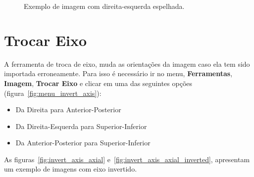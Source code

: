 \begin{figure}[!htb]
  \centering
    \qquad
  \hfill
  \caption{Exemplo de imagem com direita-esquerda espelhada.}
  \label{fig:mirrored}
\end{figure}

\section{Trocar Eixo}

A ferramenta de troca de eixo, muda as orientações da imagem caso ela tem sido importada erroneamente. Para isso é necessário ir no menu, \textbf{Ferramentas}, \textbf{Imagem}, \textbf{Trocar Eixo} e clicar em uma das seguintes opções (figura~\ref{fig:menu_invert_axis}):

\begin{itemize}
	\item Da Direita para Anterior-Posterior
	\item Da Direita-Esquerda para Superior-Inferior
	\item Da Anterior-Posterior para Superior-Inferior
\end{itemize}


As figuras~\ref{fig:invert_axis_axial} e~\ref{fig:invert_axis_axial_inverted}, apresentam um exemplo de imagens com eixo invertido.

